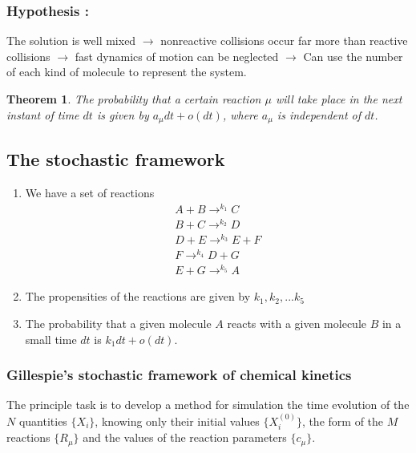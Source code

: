 \documentclass[11pt,a4paper]{article}
\newtheorem{theorem}{Theorem}
\begin{document}
\subsubsection{Hypothesis :}
The solution is well mixed $\rightarrow$ nonreactive collisions occur far more than reactive collisions $\rightarrow$ fast dynamics of motion can be neglected $\rightarrow$ Can use the number of each kind of molecule to represent the system.

\begin{theorem}
The probability that a certain reaction $\mu$ will take place in the next instant of time $dt$ is given by $a_{\mu}dt + o(dt)$, where $a_{\mu}$ is independent of $dt$.
\end{theorem}

\subsection{The stochastic framework}
\begin{enumerate}
  \item We have a set of reactions
    \begin{gather}
      {A + B \rightarrow^{k_1} C}  \\
      {B + C \rightarrow^{k_2} D}  \\
      {D + E \rightarrow^{k_3} E + F} \\
      {F \rightarrow^{k_4} D + G} \\
      {E + G \rightarrow^{k_5} A}
    \end{gather}
  \item The propensities of the reactions are given by $k_{1}, k_{2}, ... k_{5}$
  \item The probability that a given molecule $A$ reacts with a given molecule $B$ in a small time $dt$ is $k_{1}dt + o(dt)$.
\end{enumerate}

\subsubsection{Gillespie's stochastic framework of chemical kinetics}
The principle task is to develop a method for simulation the time evolution of the $N$ quantities $\{X_{i}\}$, knowing only their initial values $\{X_{i}^{(0)}\}$, the form of the $M$ reactions $\{R_{\mu}\}$ and the values of the reaction parameters $\{c_{\mu}\}$.
\end{document}
